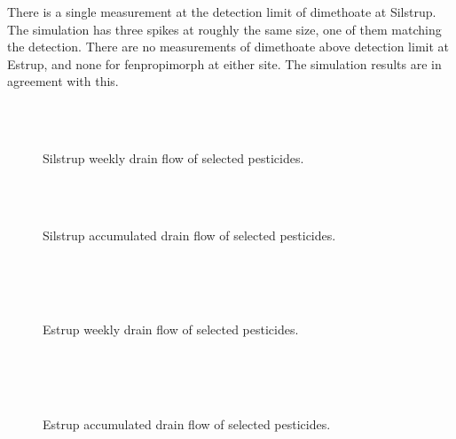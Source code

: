 There is a single measurement at the detection limit of dimethoate at
Silstrup.  The simulation has three spikes at roughly the same size,
one of them matching the detection.  There are no measurements of
dimethoate above detection limit at Estrup, and none for fenpropimorph
at either site.  The simulation results are in agreement with this.

\begin{figure}[htbp]
  \begin{center}
    \\
    \\
  \end{center}
  \caption{Silstrup weekly drain flow of selected pesticides.}
  \label{fig:Silstrup-weekly2}
\end{figure}

\begin{figure}[htbp]
  \begin{center}
    \\
    \\
  \end{center}
  \caption{Silstrup accumulated drain flow of selected pesticides.}
  \label{fig:Silstrup-acc}
\end{figure}

\begin{figure}[htbp]
  \begin{center}
    \\
    \\
    \\
  \end{center}
  \caption{Estrup weekly drain flow of selected pesticides.}
  \label{fig:Estrup-weekly}
\end{figure}

\begin{figure}[htbp]
  \begin{center}
    \\
    \\
    \\
  \end{center}
  \caption{Estrup accumulated drain flow of selected pesticides.}
  \label{fig:Estrup-acc}
\end{figure}


